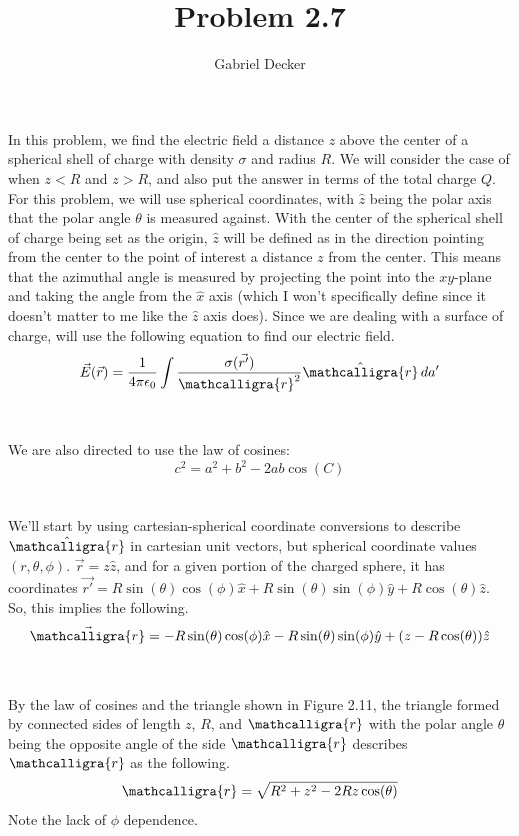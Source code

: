 \documentclass[12pt]{article}
\title{Problem 2.7}
\author{Gabriel Decker}
\newcommand{\scripty}[1]{\ensuremath{\mathcalligra{#1}}}
\begin{document}
\maketitle
\begin{flushleft}


In this problem, we find the electric field a distance $z$ above the center of a spherical shell of charge with density $\sigma$ and radius $R$.
We will consider the case of when $z<R$ and $z>R$, and also put the answer in terms of the total charge $Q$.
For this problem, we will use spherical coordinates, with $\hat{z}$ being the polar axis that the polar angle $\theta$ is measured against.
With the center of the spherical shell of charge being set as the origin, $\hat{z}$ will be defined as in the direction pointing from the center to the point of interest a distance $z$ from the center.
This means that the azimuthal angle is measured by projecting the point into the $xy$-plane and taking the angle from the $\hat{x}$ axis (which I won't specifically define since it doesn't matter to me like the $\hat{z}$ axis does).
Since we are dealing with a surface of charge, will use the following equation to find our electric field.
$$\vec{E}(\vec{r})=\frac{1}{4\pi\epsilon_0}\int\frac{\sigma(\vec{r'})}{\scripty{r}^2}\hat{\scripty{r}}\,da'$$\\~\\

We are also directed to use the law of cosines:
$$c^2=a^2+b^2-2ab\cos(C)$$\\~\\

We'll start by using cartesian-spherical coordinate conversions to describe $\hat{\scripty{r}}$ in cartesian unit vectors, but spherical coordinate values $(r,\theta,\phi)$.
$\vec{r}=z\hat{z}$, and for a given portion of the charged sphere, it has coordinates $\vec{r'}=R\sin(\theta)\cos(\phi)\hat{x}+R\sin(\theta)\sin(\phi)\hat{y}+R\cos(\theta)\hat{z}$.
So, this implies the following.
$$\vec{\scripty{r}}=-R\sin(\theta)\cos(\phi)\hat{x}-R\sin(\theta)\sin(\phi)\hat{y}+(z-R\cos(\theta))\hat{z}$$\\~\\

By the law of cosines and the triangle shown in Figure 2.11, the triangle formed by connected sides of length $z$, $R$, and $\scripty{r}$ with the polar angle $\theta$ being the opposite angle of the side $\scripty{r}$ describes $\scripty{r}$ as the following.
$$\scripty{r}=\sqrt{R^2+z^2-2Rz\cos(\theta)}$$
Note the lack of $\phi$ dependence.\\~\\


\end{flushleft}
\end{document}
